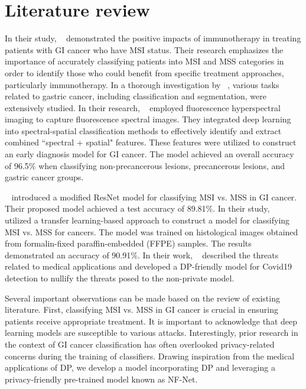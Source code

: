 \section{Literature review}
In their study, ~\cite{puliga2021microsatellite} demonstrated the positive impacts of immunotherapy in treating patients with GI cancer who have MSI status. Their research emphasizes the importance of accurately classifying patients into MSI and MSS categories in order to identify those who could benefit from specific treatment approaches, particularly immunotherapy. In a thorough investigation by ~\cite{zhao2022identification}, various tasks related to gastric cancer, including classification and segmentation, were extensively studied. In their research, ~\cite{li2019early} employed fluorescence hyperspectral imaging to capture fluorescence spectral images. They integrated deep learning into spectral-spatial classification methods to effectively identify and extract combined ``spectral + spatial" features. These features were utilized to construct an early diagnosis model for GI cancer. The model achieved an overall accuracy of 96.5\% when classifying non-precancerous lesions, precancerous lesions, and gastric cancer groups.

~\cite{sai2022modified} introduced a modified ResNet model for classifying MSI vs. MSS in GI cancer. Their proposed model achieved a test accuracy of 89.81\%. In their study, ~\cite{khan2022transfer} utilized a transfer learning-based approach to construct a model for classifying MSI vs. MSS for cancers. The model was trained on histological images obtained from formalin-fixed paraffin-embedded (FFPE) samples. The results demonstrated an accuracy of 90.91\%. In their work, ~\cite {chilukoti2022privacy} described the threats related to medical applications and developed a DP-friendly model for Covid19 detection to nullify the threats posed to the non-private model.

Several important observations can be made based on the review of existing literature. First, classifying MSI vs. MSS in GI cancer is crucial in ensuring patients receive appropriate treatment. It is important to acknowledge that deep learning models are susceptible to various attacks. Interestingly, prior research in the context of GI cancer classification has often overlooked privacy-related concerns during the training of classifiers. Drawing inspiration from the medical applications of DP, we develop a model incorporating DP and leveraging a privacy-friendly pre-trained model known as NF-Net.